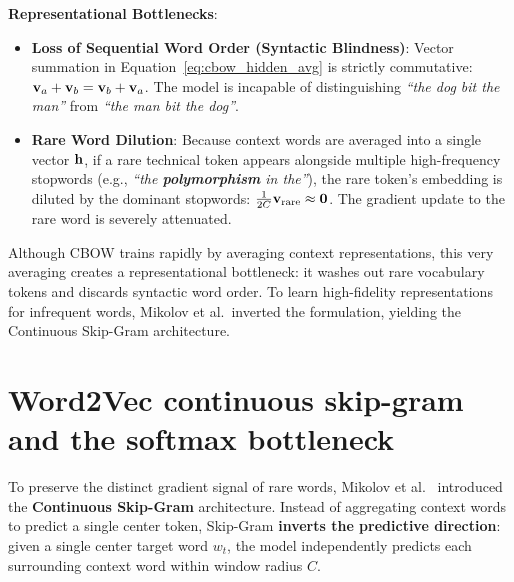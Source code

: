 \documentclass[../../main.tex]{subfiles}
\begin{document}
\noindent\textbf{Representational Bottlenecks}:
\begin{itemize}
    \item \textbf{Loss of Sequential Word Order (Syntactic Blindness)}: Vector summation in Equation~\eqref{eq:cbow_hidden_avg} is strictly commutative: $\mathbf{v}_a + \mathbf{v}_b = \mathbf{v}_b + \mathbf{v}_a$. The model is incapable of distinguishing \emph{``the dog bit the man''} from \emph{``the man bit the dog''}.
    \item \textbf{Rare Word Dilution}: Because context words are averaged into a single vector $\mathbf{h}$, if a rare technical token appears alongside multiple high-frequency stopwords (e.g., \emph{``the \textbf{polymorphism} in the''}), the rare token's embedding is diluted by the dominant stopwords: $\frac{1}{2C} \mathbf{v}_{\text{rare}} \approx \mathbf{0}$. The gradient update to the rare word is severely attenuated.
\end{itemize}

Although CBOW trains rapidly by averaging context representations, this very averaging creates a representational bottleneck: it washes out rare vocabulary tokens and discards syntactic word order. To learn high-fidelity representations for infrequent words, Mikolov et al.~inverted the formulation, yielding the Continuous Skip-Gram architecture.

\section{Word2Vec continuous skip-gram and the softmax bottleneck}
\label{sec:skipgram_architecture}

To preserve the distinct gradient signal of rare words, Mikolov et al.~\cite{mikolov2013efficient} introduced the \textbf{Continuous Skip-Gram} architecture. Instead of aggregating context words to predict a single center token, Skip-Gram \textbf{inverts the predictive direction}: given a single center target word $w_t$, the model independently predicts each surrounding context word within window radius $C$.
\end{document}
